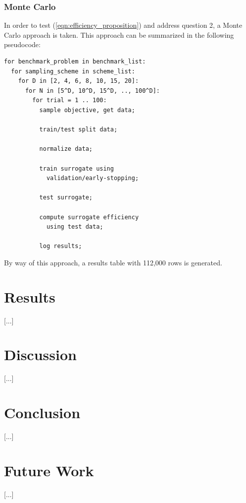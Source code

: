 \documentclass[conference]{IEEEtran}
\begin{document}
\subsubsection{Monte Carlo}

In order to test (\ref{eqn:efficiency_proposition}) and address question 2, a Monte Carlo approach is taken. This approach can be summarized in the following pseudocode:

\begin{verbatim}
for benchmark_problem in benchmark_list:
  for sampling_scheme in scheme_list:
    for D in [2, 4, 6, 8, 10, 15, 20]:
      for N in [5^D, 10^D, 15^D, .., 100^D]:
        for trial = 1 .. 100:
          sample objective, get data;
      
          train/test split data;
      
          normalize data;
      
          train surrogate using
            validation/early-stopping;
        
          test surrogate;
        
          compute surrogate efficiency
            using test data;
        
          log results;
\end{verbatim}

\noindent By way of this approach, a results table with 112,000 rows is generated.

\section{Results}

[...]

\section{Discussion}

[...]

\section{Conclusion}

[...]

\section{Future Work}

[...]



{}

\end{document}
